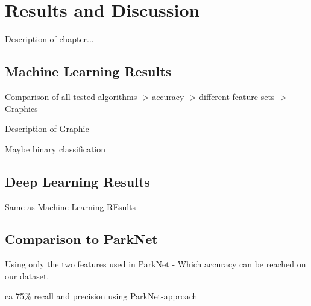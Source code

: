 \chapter{Results and Discussion}
\label{chap:evaluation}

Description of chapter...



\section{Machine Learning Results}

Comparison of all tested algorithms -> accuracy -> different feature sets -> Graphics

Description of Graphic

Maybe binary classification




\section{Deep Learning Results}

Same as Machine Learning REsults





\section{Comparison to ParkNet}

Using only the two features used in ParkNet - Which accuracy can be reached on our dataset.

ca 75\% recall and precision using ParkNet-approach